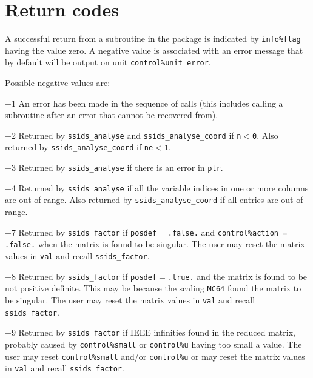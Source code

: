 \documentclass{spral}
\begin{document}

\section{Return codes} \label{errors}

A successful return from a subroutine in the package is indicated by
{\tt info\%flag} having the value zero.
A negative value is associated with an error message that by default will
be output on unit {\tt control\%unit\_error}.

Possible negative values are:

\begin{description}
\item{$-$1} An error has been made in the sequence of calls (this includes
            calling a subroutine after an error that cannot be recovered from).
\item{$-$2} Returned by {\tt ssids\_analyse} and {\tt ssids\_analyse\_coord} if
            {\tt n$<$0}. Also returned by {\tt ssids\_analyse\_coord} if
            {\tt ne$<$1}.
\item{$-$3} Returned by {\tt ssids\_analyse} if there is an error in {\tt ptr}.
\item{$-$4} Returned by {\tt ssids\_analyse} if all the variable indices in one
            or more columns  are out-of-range. Also returned by
            {\tt ssids\_analyse\_coord} if all entries are out-of-range.
\item{$-$7} Returned by {\tt ssids\_factor} if
            {\tt posdef}$=${\tt .false.} and
            {\tt control\%action = .false.} when the matrix is found to be
            singular. The user may reset the matrix values in {\tt val}
            and recall {\tt ssids\_factor}.
\item{$-$8} Returned by {\tt ssids\_factor} if
            {\tt posdef}$=${\tt .true.} and the matrix is found to
            be not positive definite. This may be because the scaling
            {\tt MC64} found the matrix to be singular. The user may reset the
            matrix values in {\tt val} and recall {\tt ssids\_factor}.
\item{$-$9} Returned by {\tt ssids\_factor} if IEEE infinities found in the
            reduced matrix, probably caused by {\tt control\%small} or
            {\tt control\%u} having too small a value. The user may reset
            {\tt control\%small} and/or {\tt control\%u} or may reset the
            matrix values in {\tt val} and recall {\tt ssids\_factor}.

\end{description}
\end{document}
